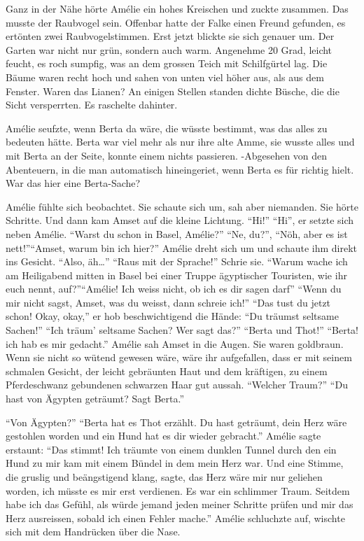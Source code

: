 \documentclass[11pt,titlepage,a5paper]{book}
\begin{document}
Ganz in der Nähe hörte Amélie ein hohes Kreischen und zuckte zusammen. Das musste der Raubvogel sein. Offenbar hatte der Falke einen Freund gefunden, es ertönten zwei Raubvogelstimmen. Erst jetzt blickte sie sich genauer um. Der Garten war nicht nur grün, sondern auch warm. Angenehme 20 Grad, leicht feucht, es roch sumpfig, was an dem grossen Teich mit Schilfgürtel lag. Die Bäume waren recht hoch und sahen von unten viel höher aus, als aus dem Fenster. Waren das Lianen? An einigen Stellen standen dichte Büsche, die die Sicht versperrten. Es raschelte dahinter.

Amélie seufzte, wenn Berta da wäre, die wüsste bestimmt, was das alles zu bedeuten hätte. Berta war viel mehr als nur ihre alte Amme, sie wusste alles und mit Berta an der Seite, konnte einem nichts passieren. -Abgesehen von den Abenteuern, in die man automatisch hineingeriet, wenn Berta es für richtig hielt. War das hier eine Berta-Sache?

Amélie fühlte sich beobachtet. Sie schaute sich um, sah aber niemanden. Sie hörte Schritte. Und dann kam Amset auf die kleine Lichtung. "`Hi!"' "`Hi"', er setzte sich neben Amélie. "`Warst du schon in Basel, Amélie?"' "`Ne, du?"', "`Nöh, aber es ist nett!"'"`Amset, warum bin ich hier?"' Amélie dreht sich um und schaute ihm direkt ins Gesicht. "`Also, äh\dots"' "`Raus mit der Sprache!"' Schrie sie. "`Warum wache ich am Heiligabend mitten in Basel bei einer Truppe ägyptischer Touristen, wie ihr euch nennt, auf?"'"`Amélie! Ich weiss nicht, ob ich es dir sagen darf"' "`Wenn du mir nicht sagst, Amset, was du weisst, dann schreie ich!"' "`Das tust du jetzt schon! Okay, okay,"' er hob beschwichtigend die Hände: "`Du träumst seltsame Sachen!"' "`Ich träum' seltsame Sachen? Wer sagt das?"' "`Berta und Thot!"' "`Berta! ich hab es mir gedacht."' Amélie sah Amset in die Augen. Sie waren goldbraun. Wenn sie nicht so wütend gewesen wäre, wäre ihr aufgefallen, dass er mit seinem schmalen Gesicht, der leicht gebräunten Haut und dem kräftigen, zu einem Pferdeschwanz gebundenen schwarzen Haar gut aussah. "`Welcher Traum?"' "`Du hast von Ägypten geträumt? Sagt Berta."' 

"`Von Ägypten?"' "`Berta hat es Thot erzählt. Du hast geträumt, dein Herz wäre gestohlen worden und ein Hund hat es dir wieder gebracht."' Amélie sagte erstaunt: "`Das stimmt! Ich träumte von einem dunklen Tunnel durch den ein Hund zu mir kam mit einem Bündel in dem mein Herz war. Und eine Stimme, die gruslig und beängstigend klang, sagte, das Herz wäre mir nur geliehen worden, ich müsste es mir erst verdienen. Es war ein schlimmer Traum. Seitdem habe ich das Gefühl, als würde jemand jeden meiner Schritte prüfen und mir das Herz ausreissen, sobald ich einen Fehler mache."' Amélie schluchzte auf, wischte sich mit dem Handrücken über die Nase.
\end{document}
